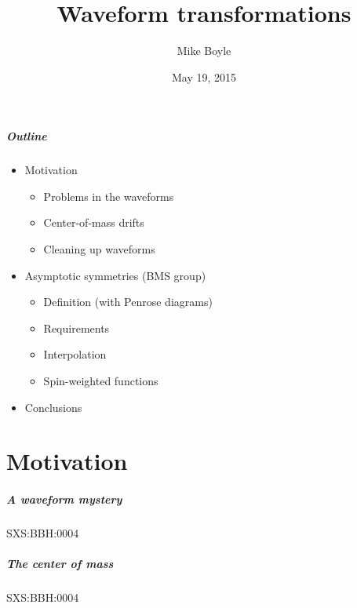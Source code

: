 \documentclass[12pt,xcolor={dvipsnames}]{beamer}
\title{Waveform transformations}
\author[Mike Boyle] {Mike Boyle}
\date{May 19, 2015}
\begin{document}
\begin{frame}[plain]
  \titlepage
\end{frame}



\begin{frame}
  \frametitle{Outline}
  \begin{itemize}
  \item Motivation
    \begin{itemize}
    \item Problems in the waveforms
    \item Center-of-mass drifts
    \item Cleaning up waveforms
    \end{itemize}
  \item Asymptotic symmetries (BMS group)
    \begin{itemize}
    \item Definition (with Penrose diagrams)
    \item Requirements
    \item Interpolation
    \item Spin-weighted functions
    \end{itemize}
  \item Conclusions
  \end{itemize}
\end{frame}



\part{Motivation}
\partpage


\begin{frame}
  \frametitle{A waveform mystery}
  SXS:BBH:0004
\end{frame}

\begin{frame}
  \frametitle{The center of mass}
  SXS:BBH:0004
\end{frame}
\end{document}
